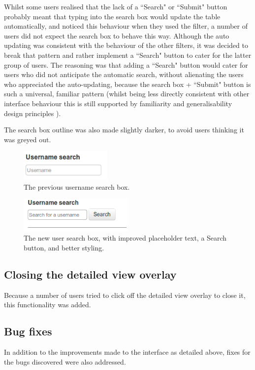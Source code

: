 Whilst some users realised that the lack of a ``Search" or ``Submit" button probably meant that typing into the search box would update the table automatically, and noticed this behaviour when they used the filter, a number of users did not expect the search box to behave this way. Although the auto updating was consistent with the behaviour of the other filters, it was decided to break that pattern and rather implement a ``Search" button to cater for the latter group of users. The reasoning was that adding a ``Search" button would cater for users who did not anticipate the automatic search, without alienating the users who appreciated the auto-updating, because the search box + ``Submit" button is such a universal, familiar pattern (whilst being less directly consistent with other interface behaviour this is still supported by familiarity and generalisability design principles \citep[p. 264]{DixFinlay}). 

The search box outline was also made slightly darker, to avoid users thinking it was greyed out.

\begin{figure}[h!]
    \centering
    \includegraphics[width=0.4\textwidth]{Figures/V2/usernameold.png}
 \caption{The previous username search box.}
\end{figure}

\begin{figure}[h!]
    \centering
    \includegraphics[width=0.5\textwidth]{Figures/V2/usernamenew.png}
 \caption{The new user search box, with improved placeholder text, a Search button, and better styling.}
\end{figure}


\subsection{Closing the detailed view overlay}
Because a number of users tried to click off the detailed view overlay to close it, this functionality was added. 

\subsection{Bug fixes}
In addition to the improvements made to the interface as detailed above, fixes for the bugs discovered were also addressed. 

